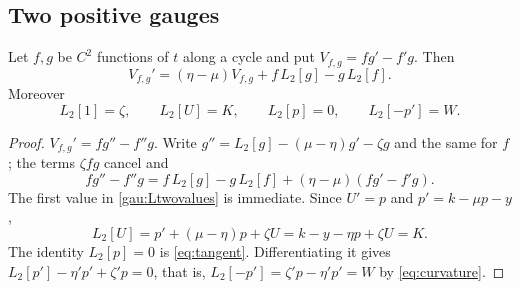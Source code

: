 \subsection{Two positive gauges}
\begin{lemma}\label{gau:wronskian}
Let $f,g$ be $C^2$ functions of $t$ along a cycle and put $V_{f,g}=fg'-f'g$. Then
\begin{equation}\label{gau:wronskianeq}
V_{f,g}'=(\eta-\mu)V_{f,g}+f\,L_2[g]-g\,L_2[f].
\end{equation}
Moreover
\begin{equation}\label{gau:Ltwovalues}
L_2[1]=\zeta,\qquad L_2[U]=K,\qquad L_2[p]=0,\qquad L_2[-p']=W .
\end{equation}
\end{lemma}
\begin{proof}
$V_{f,g}'=fg''-f''g$. Write $g''=L_2[g]-(\mu-\eta)g'-\zeta g$ and the same for $f$; the terms $\zeta fg$ cancel and
\[
fg''-f''g=f\,L_2[g]-g\,L_2[f]+(\eta-\mu)(fg'-f'g).
\]
The first value in \eqref{gau:Ltwovalues} is immediate. Since $U'=p$ and $p'=k-\mu p-y$,
\[
L_2[U]=p'+(\mu-\eta)p+\zeta U=k-y-\eta p+\zeta U=K .
\]
The identity $L_2[p]=0$ is \eqref{eq:tangent}. Differentiating it gives $L_2[p']-\eta'p'+\zeta'p=0$, that is, $L_2[-p']=\zeta'p-\eta'p'=W$ by \eqref{eq:curvature}.
\end{proof}


